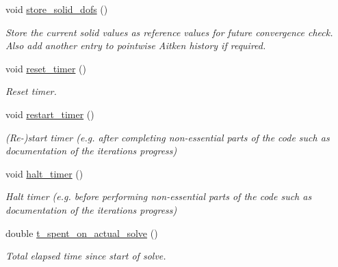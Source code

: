 \begin{DoxyCompactItemize}
void \hyperlink{classoomph_1_1SegregatableFSIProblem_af6a9e7b6f13b86bf86b65cfb7c4f966f}{store\+\_\+solid\+\_\+dofs} ()
\begin{DoxyCompactList}\small\item\em Store the current solid values as reference values for future convergence check. Also add another entry to pointwise Aitken history if required. \end{DoxyCompactList}\item 
void \hyperlink{classoomph_1_1SegregatableFSIProblem_a61ae984ed6baba413b7577ce1d1b5dc3}{reset\+\_\+timer} ()
\begin{DoxyCompactList}\small\item\em Reset timer. \end{DoxyCompactList}\item 
void \hyperlink{classoomph_1_1SegregatableFSIProblem_a2896156c47a5a6c2e7a390057d394e10}{restart\+\_\+timer} ()
\begin{DoxyCompactList}\small\item\em (Re-\/)start timer (e.\+g. after completing non-\/essential parts of the code such as documentation of the iteration\textquotesingle{}s progress) \end{DoxyCompactList}\item 
void \hyperlink{classoomph_1_1SegregatableFSIProblem_a6282056a5c22b707a1e6c939a3f73dcd}{halt\+\_\+timer} ()
\begin{DoxyCompactList}\small\item\em Halt timer (e.\+g. before performing non-\/essential parts of the code such as documentation of the iteration\textquotesingle{}s progress) \end{DoxyCompactList}\item 
double \hyperlink{classoomph_1_1SegregatableFSIProblem_adaaaa08352182dc5e0a38c7003cb7a6b}{t\+\_\+spent\+\_\+on\+\_\+actual\+\_\+solve} ()
\begin{DoxyCompactList}\small\item\em Total elapsed time since start of solve. \end{DoxyCompactList}\end{DoxyCompactItemize}
